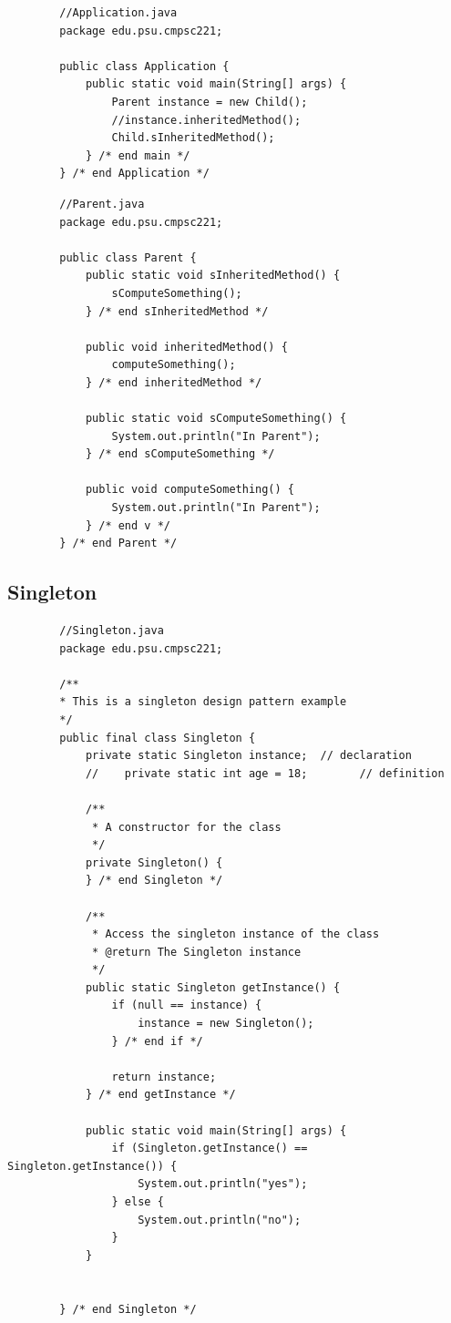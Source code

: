 \documentclass[a4paper, 11pt]{article}
\begin{document}
        \begin{lstlisting}
        //Application.java
        package edu.psu.cmpsc221;

        public class Application {
            public static void main(String[] args) {
                Parent instance = new Child();
                //instance.inheritedMethod();
                Child.sInheritedMethod();
            } /* end main */
        } /* end Application */
        \end{lstlisting}

        \begin{lstlisting}
        //Parent.java
        package edu.psu.cmpsc221;

        public class Parent {
            public static void sInheritedMethod() {
                sComputeSomething();
            } /* end sInheritedMethod */

            public void inheritedMethod() {
                computeSomething();
            } /* end inheritedMethod */

            public static void sComputeSomething() {
                System.out.println("In Parent");
            } /* end sComputeSomething */

            public void computeSomething() {
                System.out.println("In Parent");
            } /* end v */
        } /* end Parent */
        \end{lstlisting}

    \newpage

    \subsection{Singleton}
        \begin{lstlisting}
        //Singleton.java
        package edu.psu.cmpsc221;

        /**
        * This is a singleton design pattern example
        */
        public final class Singleton {
            private static Singleton instance;  // declaration
            //    private static int age = 18;        // definition

            /**
             * A constructor for the class
             */
            private Singleton() {
            } /* end Singleton */

            /**
             * Access the singleton instance of the class
             * @return The Singleton instance
             */
            public static Singleton getInstance() {
                if (null == instance) {
                    instance = new Singleton();
                } /* end if */

                return instance;
            } /* end getInstance */

            public static void main(String[] args) {
                if (Singleton.getInstance() == Singleton.getInstance()) {
                    System.out.println("yes");
                } else {
                    System.out.println("no");
                }
            }


        } /* end Singleton */
        \end{lstlisting}
\end{document}
